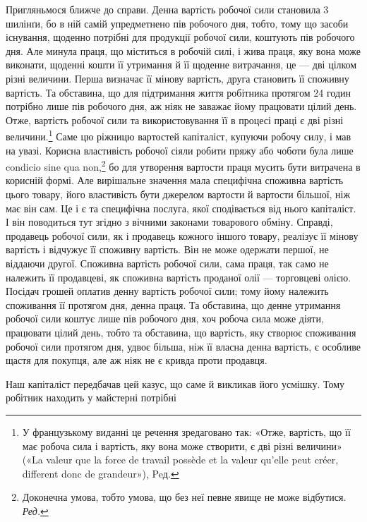 Пригляньмося ближче до справи. Денна вартість робочої
сили становила 3 шилінґи, бо в ній самій упредметнено пів робочого
дня, тобто, тому що засоби існування, щоденно потрібні
для продукції робочої сили, коштують пів робочого дня. Але
минула праця, що міститься в робочій силі, і жива праця, яку
вона може виконати, щоденні кошти її утримання й її щоденне
витрачання, це — дві цілком різні величини. Перша визначає
її мінову вартість, друга становить її споживну вартість. Та
обставина, що для підтримання життя робітника протягом 24 годин
потрібно лише пів робочого дня, аж ніяк не заважає йому
працювати цілий день. Отже, вартість робочої сили та використовування
її в процесі праці є дві різні величини.\footnote*{
У французькому виданні це речення зредаговано так: «Отже, вартість,
що її має робоча сила і вартість, яку вона може створити, є дві різні
величини» («La valeur que la force de travail possède et la valeur qu’elle
peut créer, different donc de grandeur»), Peд.
} Саме цю
ріжницю вартостей капіталіст, купуючи робочу силу, і мав на
увазі. Корисна властивість робочої сіяли робити пряжу або чоботи
була лише condicio sine qua non,\footnote*{
Доконечна умова, тобто умова, що без неї певне явище не може відбутися.
\emph{Ред.}
} бо для утворення вартости
праця мусить бути витрачена в корисній формі. Але вирішальне
значення мала специфічна споживна вартість цього товару, його
властивість бути джерелом вартости й вартости більшої, ніж має
він сам. Це і є та специфічна послуга, якої сподівається від нього
капіталіст. І він поводиться тут згідно з вічними законами товарового
обміну. Справді, продавець робочої сили, як і продавець
кожного іншого товару, реалізує її мінову вартість і відчужує її
споживну вартість. Він не може одержати першої, не віддаючи
другої. Споживна вартість робочої сили, сама праця, так само
не належить її продавцеві, як споживна вартість проданої олії —
торговцеві олією. Посідач грошей оплатив денну вартість робочої
сили; тому йому належить споживання її протягом дня, денна
праця. Та обставина, що денне утримання робочої сили коштує
лише пів робочого дня, хоч робоча сила може діяти, працювати
цілий день, тобто та обставина, що вартість, яку створює споживання
робочої сили протягом дня, удвоє більша, ніж її власна
денна вартість, є особливе щастя для покупця, але аж ніяк не
є кривда проти продавця.

Наш капіталіст передбачав цей казус, що саме й викликав
його усмішку. Тому робітник находить у майстерні потрібні
\parbreak{}  %
